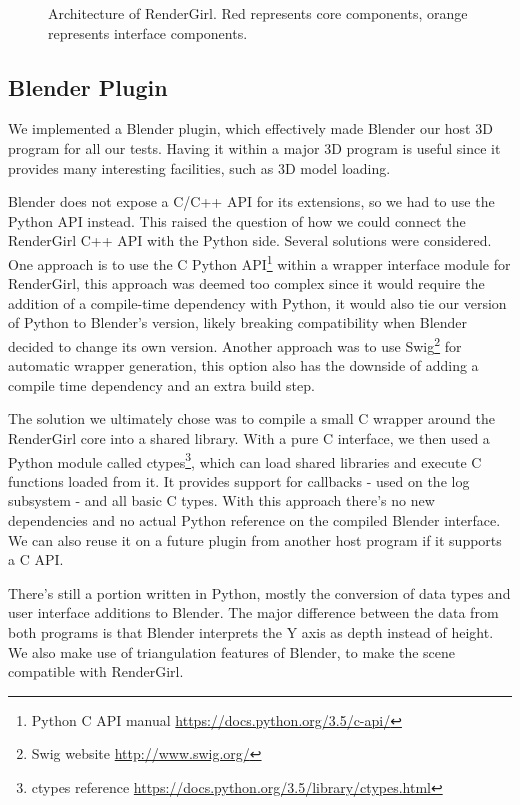 \documentclass{vgtc}
\begin{document}
\begin{figure}
\centering

\caption{Architecture of RenderGirl. Red represents core components,
  orange represents interface components.}
\label{fig:architecture}
\end{figure}

\subsection{Blender Plugin}

We implemented a Blender plugin, which effectively made Blender our
host 3D program for all our tests. Having it within a major 3D program
is useful since it provides many interesting facilities, such as 3D
model loading.

Blender does not expose a C/C++ API for its extensions, so we had to
use the Python API instead. This raised the question of how we could
connect the RenderGirl C++ API with the Python side. Several solutions
were considered. One approach is to use the C Python
API\footnote{Python C API manual
  \url{https://docs.python.org/3.5/c-api/}} within a wrapper interface
module for RenderGirl, this approach was deemed too complex since it
would require the addition of a compile-time dependency with Python, it
would also tie our version of Python to Blender's version, likely
breaking compatibility when Blender decided to change its own
version. Another approach was to use Swig\footnote{Swig website
  \url{http://www.swig.org/}} for automatic wrapper generation, this
option also has the downside of adding a compile time dependency and an
extra build step.

The solution we ultimately chose was to compile a small C wrapper
around the RenderGirl core into a shared library. With a pure C
interface, we then used a Python module called ctypes\footnote{ctypes
  reference \url{https://docs.python.org/3.5/library/ctypes.html}},
which can load shared libraries and execute C functions loaded from
it. It provides support for callbacks - used on the log subsystem -
and all basic C types. With this approach there's no new dependencies
and no actual Python reference on the compiled Blender interface. We
can also reuse it on a future plugin from another host program if it
supports a C API.

There's still a portion written in Python, mostly the conversion of
data types and user interface additions to Blender. The major
difference between the data from both programs is that Blender
interprets the Y axis as depth instead of height. We also make use
of triangulation features of Blender, to make the scene compatible
with RenderGirl.
\end{document}

